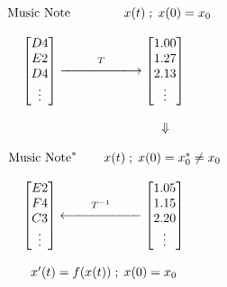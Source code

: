 \documentclass{article}
\newcommand{\xdownarrow}[1]{%
  {\left\Downarrow\vbox to #1{}\right.\kern-\nulldelimiterspace}
}
\begin{document}
\begin{align*}
\begin{array}{c@{\hspace{2cm}}c}
\hspace{0.3cm} \text{Music Note} \hspace{1.5cm} \text{\(x(t) \; ; \; x(0) = x_0\)} \\
\\
\begin{bmatrix}
D4 \\ 
E2 \\ 
D4 \\
\vdots
\end{bmatrix}
\overset{T}{\xlongrightarrow{\hspace{2cm}}}
\begin{bmatrix}
1.00 \\ 
1.27 \\ 
2.13 \\
\vdots
\end{bmatrix} \\
\\
\hspace{3.45cm} \xdownarrow{0.25cm} \\
\\
\hspace{0.6cm} \text{Music Note}^* \hspace{0.75cm} \text{\(x(t) \; ; \; x(0) = x^*_0 \neq x_0\)} \\
\\
\begin{bmatrix}
E2 \\ 
F4 \\
C3  \\
\vdots
\end{bmatrix}
\overset{T^{-1}}{\xlongleftarrow{\hspace{2cm}}}
\begin{bmatrix}
1.05 \\ 
1.15 \\
2.20  \\
\vdots
\end{bmatrix} \\ \\
x^\prime(t) = f(x(t)) \; ; \; x(0) = x_0
\end{array}
\end{align*}
\end{document}
